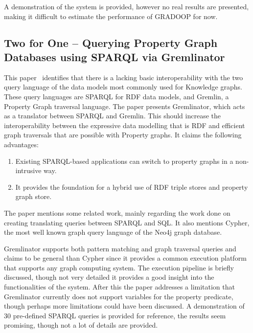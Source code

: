 A demonstration of the system is provided, however no real results are presented, making it difficult to estimate the performance of GRADOOP for now.


\subsection{Two for One – Querying Property Graph Databases using SPARQL via Gremlinator}
This paper~\cite{Thakkar2018TwoFO} identifies that there is a lacking basic interoperability with the two query language of the data models most commonly used for Knowledge graphs. These query languages are SPARQL for RDF data models, and Gremlin, a Property Graph traversal language. The paper presents Gremlinator, which acts as a translator between SPARQL and Gremlin. This should increase the interoperability between the expressive data modelling that is RDF and efficient graph traversals that are possible with Property graphs. It claims the following advantages: 
\begin{enumerate}
    \item Existing SPARQL-based applications can switch to property graphs in a non-intrusive way. 
    \item It provides the foundation for a hybrid use of RDF triple stores and property graph store. 
\end{enumerate}

The paper mentions some related work, mainly regarding the work done on creating translating queries between SPARQL and SQL. It also mentions Cypher, the most well known graph query language of the Neo4j graph database.

Gremlinator supports both pattern matching and graph traversal queries and claims to be general than Cypher since it provides a common execution platform that supports any graph computing system. The execution pipeline is briefly discussed, though not very detailed it provides a good insight into the functionalities of the system. After this the paper addresses a limitation that Gremlinator currently does not support variables for the property predicate, though perhaps more limitations could have been discussed. A demonstration of 30 pre-defined SPARQL queries is provided for reference, the results seem promising, though not a lot of details are provided. 



